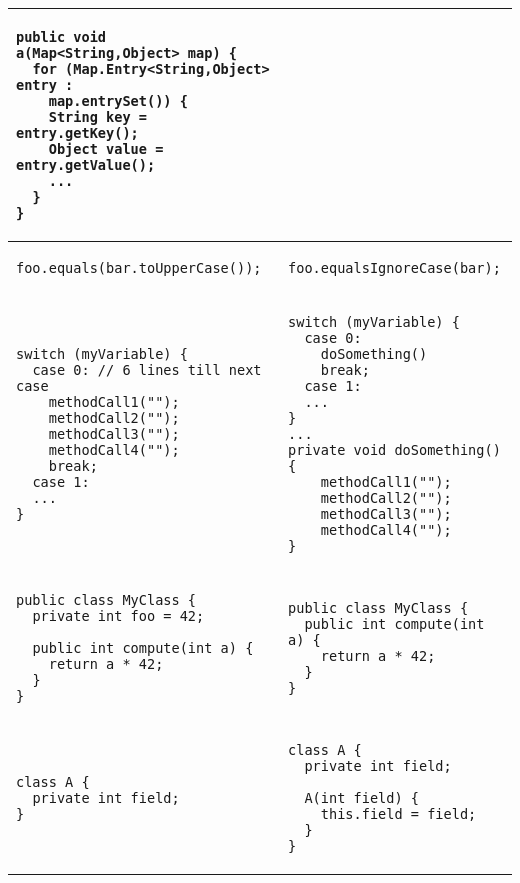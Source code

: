 \documentclass[a4paper]{article}
\begin{document}
\begin{center}
\begin{tabular}{|p{}|p{}|}
   	\begin{lstlisting}
public void a(Map<String,Object> map) {
  for (Map.Entry<String,Object> entry : 
  	map.entrySet()) {
    String key = entry.getKey();
    Object value = entry.getValue();
    ...
  }
}
  	\end{lstlisting}  \\
  	\hline
	\begin{lstlisting}
foo.equals(bar.toUpperCase());
  	\end{lstlisting} 
   	& 
   	\begin{lstlisting}
foo.equalsIgnoreCase(bar);  
  	\end{lstlisting}  \\
  	\hline
	\begin{lstlisting}
switch (myVariable) {
  case 0: // 6 lines till next case
    methodCall1("");
    methodCall2("");
    methodCall3("");
    methodCall4("");
    break;
  case 1:
  ...
}
  	\end{lstlisting} 
   	& 
   	\begin{lstlisting}
switch (myVariable) {
  case 0:                  
    doSomething()
    break;
  case 1:
  ...
}
...
private void doSomething(){
    methodCall1("");
    methodCall2("");
    methodCall3("");
    methodCall4("");
} 
  	\end{lstlisting}  \\
  	\hline
	\begin{lstlisting}
public class MyClass {
  private int foo = 42;

  public int compute(int a) {
    return a * 42;
  }
}
  	\end{lstlisting} 
   	& 
   	\begin{lstlisting}
public class MyClass {
  public int compute(int a) {
    return a * 42;
  }
}
  	\end{lstlisting}  \\
  	\hline
	\begin{lstlisting}
class A { 
  private int field;
}
  	\end{lstlisting} 
   	& 
   	\begin{lstlisting}
class A {
  private int field;

  A(int field) {
    this.field = field;
  }
}
  	\end{lstlisting}  \\
  	\hline
\end{tabular}  
  
\end{center} 
\end{document}
